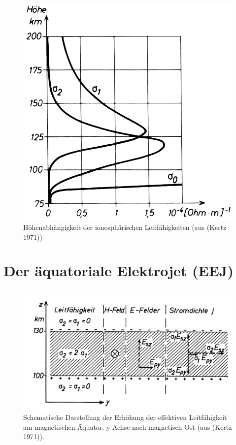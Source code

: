 \documentclass[
  a4paper,
  DIV=11]{scrreprt}
\begin{document}
\begin{figure}

{\centering \includegraphics{./images/hoehenabh_leitf.png}

}

\caption{Höhenabhängigkeit der ionosphärischen Leitfähigkeiten (aus
(Kertz 1971))}

\end{figure}

\hypertarget{der-uxe4quatoriale-elektrojet-eej}{%
\section{Der äquatoriale Elektrojet
(EEJ)}\label{der-uxe4quatoriale-elektrojet-eej}}

\begin{figure}

{\centering \includegraphics{./images/aequator_leitf.png}

}

\caption{Schematische Darstellung der Erhöhung der effektiven
Leitfähigkeit am magnetischen Äquator. y-Achse nach magnetisch Ost (aus
(Kertz 1971)).}

\end{figure}
\end{document}
